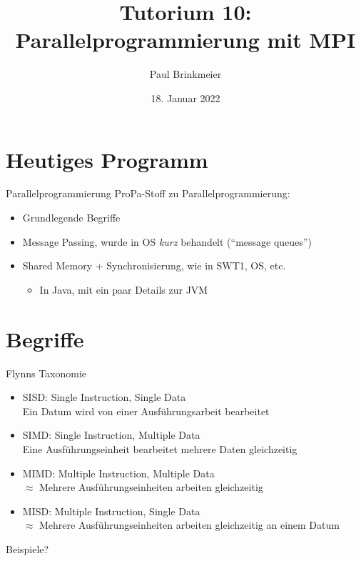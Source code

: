 \documentclass{beamer}
\title{Tutorium 10: Parallelprogrammierung mit MPI}
\author{Paul Brinkmeier}
\institute{Tutorium Programmierparadigmen am KIT}
\date{18. Januar 2022}
\begin{document}
\begin{frame}
	\titlepage
\end{frame}


\section{Heutiges Programm}

\begin{frame}{Parallelprogrammierung}
	ProPa-Stoff zu Parallelprogrammierung:

	\begin{itemize}
		\item Grundlegende Begriffe
		\item Message Passing, wurde in OS \emph{kurz} behandelt (\enquote{message queues})
		\item Shared Memory + Synchronisierung, wie in SWT1, OS, etc.
		\begin{itemize}
			\item In Java, mit ein paar Details zur JVM
		\end{itemize}
	\end{itemize}
\end{frame}

\section{Begriffe}

\begin{frame}{Flynns Taxonomie}
	\begin{itemize}
		\item SISD: Single Instruction, Single Data\\
			{\footnotesize Ein Datum wird von einer Ausführungsarbeit bearbeitet}
		\item SIMD: Single Instruction, Multiple Data\\
			{\footnotesize Eine Ausführungseinheit bearbeitet mehrere Daten gleichzeitig}
		\item MIMD: Multiple Instruction, Multiple Data\\
			{\footnotesize $\approx$ Mehrere Ausführungseinheiten arbeiten gleichzeitig}
		\item MISD: Multiple Instruction, Single Data\\
			{\footnotesize $\approx$ Mehrere Ausführungseinheiten arbeiten gleichzeitig an einem Datum}
	\end{itemize}

	\pause
	Beispiele?
\end{frame}
\end{document}
